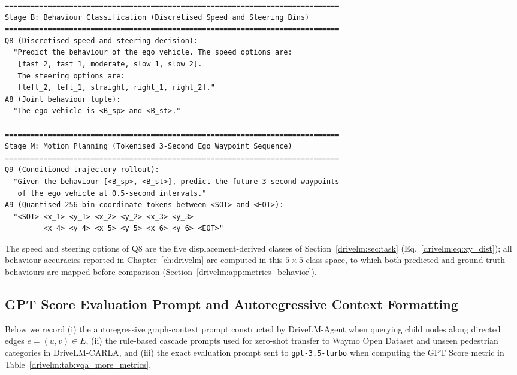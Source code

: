 \begin{footnotesize}
\begin{spacing}{1.15}
\begin{verbatim}
==============================================================================
Stage B: Behaviour Classification (Discretised Speed and Steering Bins)
==============================================================================
Q8 (Discretised speed-and-steering decision):
  "Predict the behaviour of the ego vehicle. The speed options are:
   [fast_2, fast_1, moderate, slow_1, slow_2].
   The steering options are:
   [left_2, left_1, straight, right_1, right_2]."
A8 (Joint behaviour tuple):
  "The ego vehicle is <B_sp> and <B_st>."

==============================================================================
Stage M: Motion Planning (Tokenised 3-Second Ego Waypoint Sequence)
==============================================================================
Q9 (Conditioned trajectory rollout):
  "Given the behaviour [<B_sp>, <B_st>], predict the future 3-second waypoints
   of the ego vehicle at 0.5-second intervals."
A9 (Quantised 256-bin coordinate tokens between <SOT> and <EOT>):
  "<SOT> <x_1> <y_1> <x_2> <y_2> <x_3> <y_3>
         <x_4> <y_4> <x_5> <y_5> <x_6> <y_6> <EOT>"
\end{verbatim}
\end{spacing}
\end{footnotesize}

The speed and steering options of Q8 are the five displacement-derived classes of Section~\ref{drivelm:sec:task} (Eq.~\eqref{drivelm:eq:xy_dist}); all behaviour accuracies reported in Chapter~\ref{ch:drivelm} are computed in this $5 \times 5$ class space, to which both predicted and ground-truth behaviours are mapped before comparison (Section~\ref{drivelm:app:metrics_behavior}).

\subsection{GPT Score Evaluation Prompt and Autoregressive Context Formatting}\label{app:supp:gpt_prompt}

Below we record (i) the autoregressive graph-context prompt constructed by DriveLM-Agent when querying child nodes along directed edges $e=(u,v)\in E$, (ii) the rule-based cascade prompts used for zero-shot transfer to Waymo Open Dataset and unseen pedestrian categories in DriveLM-CARLA, and (iii) the exact evaluation prompt sent to \texttt{gpt-3.5-turbo} when computing the GPT Score metric in Table~\ref{drivelm:tab:vqa_more_metrics}.

